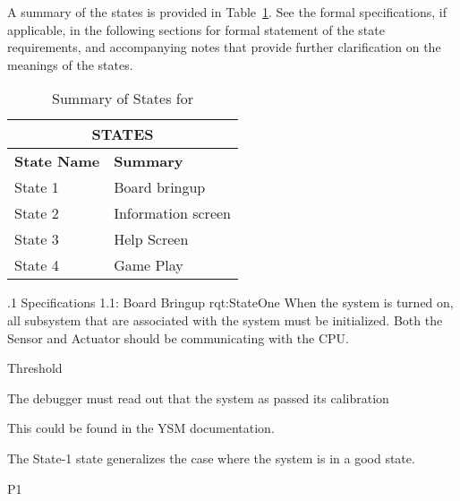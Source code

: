 A summary of the states is provided in Table~\ref{tab:States}.
See the formal specifications, if applicable, in the following sections for formal statement of the state requirements, and accompanying notes that provide further clarification on the meanings of the states.

\begin{table}[h]
	\begin{center}
		\begin{tabular}{|p{1.0in}|p{5.0in}|}
			\hline
			\hline
			\multicolumn{2}{|c|}{{\bf STATES}} \\
			\hline
				{\bf State Name} & {\bf Summary} \\
			\hline
			\hline
State 1 & Board bringup        \\ \hline
State 2 & Information screen   \\ \hline
State 3 & Help Screen          \\ \hline
State 4 & Game Play            \\
			\hline
			\hline
		\end{tabular}
		\caption{Summary of States for \ThisSystem}
		\label{tab:States}
	\end{center}
\end{table}


\ONERQMTV
{\RqtNumberBase.1}
{Specifications 1.1: Board Bringup}
{rqt:StateOne}
{
	When the system is turned on, all subsystem that are associated with the system must be initialized. Both the Sensor and Actuator should be communicating with the CPU.
}
{
	\item [Phase 1] Threshold
}
{
	The debugger must read out that the system as passed its calibration
}
{
	\item [1] This could be found in the YSM documentation.
}
{
	\item The State-1 state generalizes the case where the system is in a good state.
}
{P1}


